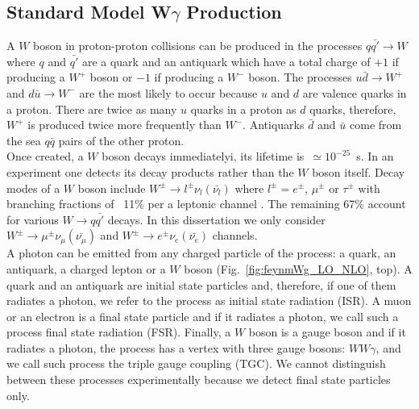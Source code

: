 \subsection{Standard Model W$\gamma$ Production}
\label{sec:WgAbout_SMproduction}

A $W$ boson in proton-proton collisions can be produced in the processes $q {\bar{q'}} \rightarrow W$ where $q$ and $\bar{q'}$ are a quark and an antiquark which have a total charge of $+1$ if producing a $W^+$ boson or $-1$ if producing a $W^-$ boson. The processes $u\bar{d}\rightarrow W^+$ and $d\bar{u}\rightarrow W^-$ are the most likely to occur because $u$ and $d$ are valence quarks in a proton. There are twice as many $u$ quarks in a proton as $d$ quarks, therefore, $W^+$ is produced twice more frequently than $W^-$. Antiquarks $\bar{d}$ and $\bar{u}$ come from the sea $q\bar{q}$ pairs of the other proton.\\

Once created, a $W$ boson decays immediatelyi, its lifetime is~$\simeq 10^{-25}$~s. In an experiment one detects its decay products rather than the $W$ boson itself. Decay modes of a $W$ boson include $W^\pm \rightarrow l^\pm \nu_l ({\bar{\nu_l}})$ where $l^\pm=e^\pm$, $\mu^\pm$ or $\tau^\pm$ with branching fractions of ~11\% per a leptonic channel \cite{ref_PDG}. The remaining 67\% account for various $W\rightarrow q\bar{q'}$ decays. In this dissertation we only consider $W^\pm \rightarrow \mu^\pm \nu_\mu ({\bar{\nu_\mu}})$ and $W^\pm \rightarrow e^\pm \nu_e ({\bar{\nu_e}})$ channels.\\


A photon can be emitted from any charged particle of the process: a quark, an antiquark, a charged lepton or a $W$ boson (Fig.~\ref{fig:feynmWg_LO_NLO}, top). A quark and an antiquark are initial state particles and, therefore, if one of them radiates a photon, we refer to the process as initial state radiation (ISR). A muon or an electron is a final state particle and if it radiates a photon, we call such a process final state radiation (FSR). Finally, a $W$ boson is a gauge boson and if it radiates a photon, the process has a vertex with three gauge bosons: $WW\gamma$, and we call such process the triple gauge coupling (TGC). We cannot distinguish between these processes experimentally because we detect final state particles only.\\

